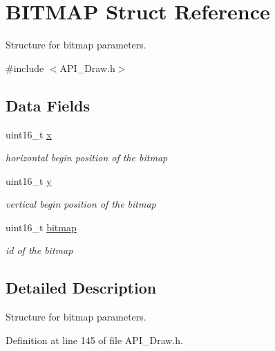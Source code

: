 \hypertarget{struct_b_i_t_m_a_p}{}\section{B\+I\+T\+M\+AP Struct Reference}
\label{struct_b_i_t_m_a_p}


Structure for bitmap parameters.  




{\ttfamily \#include $<$A\+P\+I\+\_\+\+Draw.\+h$>$}

\subsection*{Data Fields}
\begin{DoxyCompactItemize}
\item 
\mbox{\label{struct_b_i_t_m_a_p_a4dde988b1b2adba65ae3efa69f65d960}} 
uint16\+\_\+t \hyperlink{struct_b_i_t_m_a_p_a4dde988b1b2adba65ae3efa69f65d960}{x}
\begin{DoxyCompactList}\small\item\em horizontal begin position of the bitmap \end{DoxyCompactList}\item 
\mbox{\label{struct_b_i_t_m_a_p_ab0580f504a7428539be299fa71565f30}} 
uint16\+\_\+t \hyperlink{struct_b_i_t_m_a_p_ab0580f504a7428539be299fa71565f30}{y}
\begin{DoxyCompactList}\small\item\em vertical begin position of the bitmap \end{DoxyCompactList}\item 
uint16\+\_\+t \hyperlink{struct_b_i_t_m_a_p_a02b2be7b8ce086893453d390c5fdcf1d}{bitmap}
\begin{DoxyCompactList}\small\item\em id of the bitmap \end{DoxyCompactList}\end{DoxyCompactItemize}


\subsection{Detailed Description}
Structure for bitmap parameters. 

Definition at line 145 of file A\+P\+I\+\_\+\+Draw.\+h.



